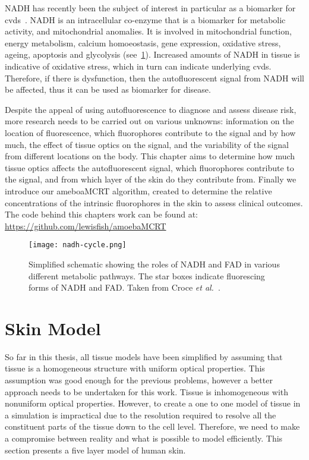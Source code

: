 NADH has recently been the subject of interest in particular as a biomarker for \gls*{cvds}~\cite{akbar2014vivo,elahi2009oxidative,blacker2016investigating}.
NADH is an intracellular co-enzyme that is a biomarker for metabolic activity, and mitochondrial anomalies. 
It is involved in mitochondrial function, energy metabolism, calcium homoeostasis, gene expression, oxidative stress, ageing, apoptosis and glycolysis (see~\cref{fig:nadhfadpath}).
Increased amounts of NADH in tissue is indicative of oxidative stress, which in turn can indicate underlying \gls*{cvds}.
Therefore, if there is dysfunction, then the autofluorescent signal from NADH will be affected, thus it can be used as biomarker for disease.

Despite the appeal of using autofluorescence to diagnose and assess disease risk, more research needs to be carried out on various unknowns: information on the location of fluorescence, which fluorophores contribute to the signal and by how much, the effect of tissue optics on the signal, and the variability of the signal from different locations on the body.
This chapter aims to determine how much tissue optics affects the autofluorescent signal, which fluorophores contribute to the signal, and from which layer of the skin do they contribute from.
Finally we introduce our ameboaMCRT algorithm, created to determine the relative concentrations of the intrinsic fluorophores in the skin to assess clinical outcomes.
The code behind this chapters work can be found at: \url{https://github.com/lewisfish/amoebaMCRT}

\begin{figure}[!htpb]
  \centering
  \texttt{[image: nadh-cycle.png]}
  \caption{Simplified schematic showing the roles of NADH and FAD in various different metabolic pathways. The star boxes indicate fluorescing forms of NADH and FAD. Taken from Croce \textit{et al.}~\cite{croce2014autofluorescence}.}
  \label{fig:nadhfadpath}
\end{figure}


\FloatBarrier

\section{Skin Model}

So far in this thesis, all tissue models have been simplified by assuming that tissue is a homogeneous structure with uniform optical properties.
This assumption was good enough for the previous problems, however a better approach needs to be undertaken for this work.
Tissue is inhomogeneous with nonuniform optical properties.
However, to create a one to one model of tissue in a simulation is impractical due to the resolution required to resolve all the constituent parts of the tissue down to the cell level.
Therefore, we need to make a compromise between reality and what is possible to model efficiently.
This section presents a five layer model of human skin. 

